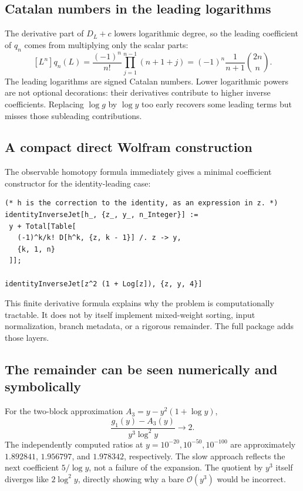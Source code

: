 \documentclass[11pt,a4paper]{article}
\numberwithin{equation}{section}
\theoremstyle{definition}
\theoremstyle{remark}
\newcommand{\OO}{\mathcal O}
\begin{document}
\subsection{Catalan numbers in the leading logarithms}

The derivative part of $D_L+c$ lowers logarithmic degree, so the leading
coefficient of $q_n$ comes from multiplying only the scalar parts:
\[
 [L^n]q_n(L)
 =\frac{(-1)^n}{n!}\prod_{j=1}^{n-1}(n+1+j)
 =(-1)^n\frac1{n+1}\binom{2n}{n}.
\]
The leading logarithms are signed Catalan numbers. Lower logarithmic
powers are not optional decorations: their derivatives contribute to
higher inverse coefficients. Replacing $\log g$ by $\log y$ too early
recovers some leading terms but misses those subleading contributions.

\subsection{A compact direct Wolfram construction}

The observable homotopy formula immediately gives a minimal coefficient
constructor for the identity-leading case:
\begin{lstlisting}
(* h is the correction to the identity, as an expression in z. *)
identityInverseJet[h_, {z_, y_, n_Integer}] :=
 y + Total[Table[
   (-1)^k/k! D[h^k, {z, k - 1}] /. z -> y,
   {k, 1, n}
 ]];

identityInverseJet[z^2 (1 + Log[z]), {z, y, 4}]
\end{lstlisting}
This finite derivative formula explains why the problem is computationally
tractable. It does not by itself implement mixed-weight sorting, input
normalization, branch metadata, or a rigorous remainder. The full package
adds those layers.

\subsection{The remainder can be seen numerically and symbolically}

For the two-block approximation $A_3=y-y^2(1+\log y)$,
\[
 \frac{g_1(y)-A_3(y)}{y^3\log^2 y}\longrightarrow2.
\]
The independently computed ratios at $y=10^{-20},10^{-50},10^{-100}$ are
approximately $1.892841$, $1.956797$, and $1.978342$, respectively. The slow
approach reflects the next coefficient $5/\log y$, not a failure of the
expansion. The quotient by $y^3$ itself diverges like $2\log^2y$, directly
showing why a bare $\OO(y^3)$ would be incorrect.
\end{document}

